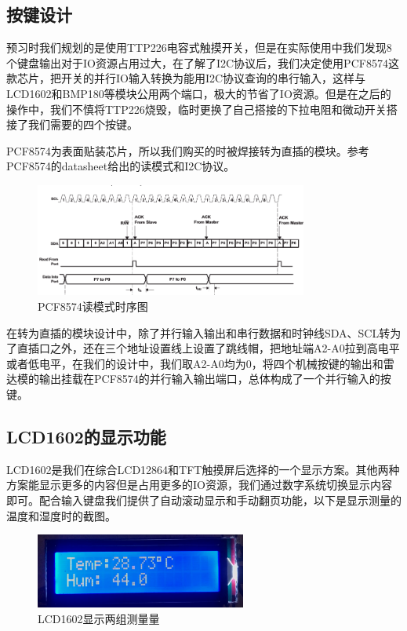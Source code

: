 \documentclass[a4paper, 11pt]{article} %
\begin{document}
\subsection{按键设计}

预习时我们规划的是使用TTP226电容式触摸开关，但是在实际使用中我们发现8个键盘输出对于IO资源占用过大，在了解了I2C协议后，我们决定使用PCF8574这款芯片，把开关的并行IO输入转换为能用I2C协议查询的串行输入，这样与LCD1602和BMP180等模块公用两个端口，极大的节省了IO资源。但是在之后的操作中，我们不慎将TTP226烧毁，临时更换了自己搭接的下拉电阻和微动开关搭接了我们需要的四个按键。

PCF8574为表面贴装芯片，所以我们购买的时被焊接转为直插的模块。参考PCF8574的datasheet给出的读模式和I2C协议\cite{PCF8574}\cite{wiki:I2C}。

\begin{figure}[H]
  \centering
  \includegraphics[width = 0.8\textwidth]{PCF_read.png}
  \caption{PCF8574读模式时序图}
\end{figure}

在转为直插的模块设计中，除了并行输入输出和串行数据和时钟线SDA、SCL转为了直插口之外，还在三个地址设置线上设置了跳线帽，把地址端A2-A0拉到高电平或者低电平，在我们的设计中，我们取A2-A0均为0，将四个机械按键的输出和雷达模的输出挂载在PCF8574的并行输入输出端口，总体构成了一个并行输入的按键。

\subsection{LCD1602的显示功能}

LCD1602是我们在综合LCD12864和TFT触摸屏后选择的一个显示方案。其他两种方案能显示更多的内容但是占用更多的IO资源，我们通过数字系统切换显示内容即可。配合输入键盘我们提供了自动滚动显示和手动翻页功能，以下是显示测量的温度和湿度时的截图。

\begin{figure}[H]
  \centering
  \includegraphics[width = 0.618\textwidth]{LCD.png}
  \caption{LCD1602显示两组测量量}
\end{figure}
\end{document}
